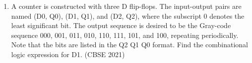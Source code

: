 \begin{enumerate}
	\item 		
		A counter is constructed with three D flip-flops. The input-output pairs are named (D0, Q0), (D1, Q1), and (D2, Q2), where the subscript 0 denotes the least significant bit. The output sequence is desired to be the Gray-code sequence 000, 001, 011, 010, 110, 111, 101, and 100, repeating periodically. Note that the bits are listed in the Q2 Q1 Q0 format. Find the combinational logic expression for D1.
\label{prob:2021-gate-ee-37}
\hfill (CBSE 2021)

\end{enumerate}
